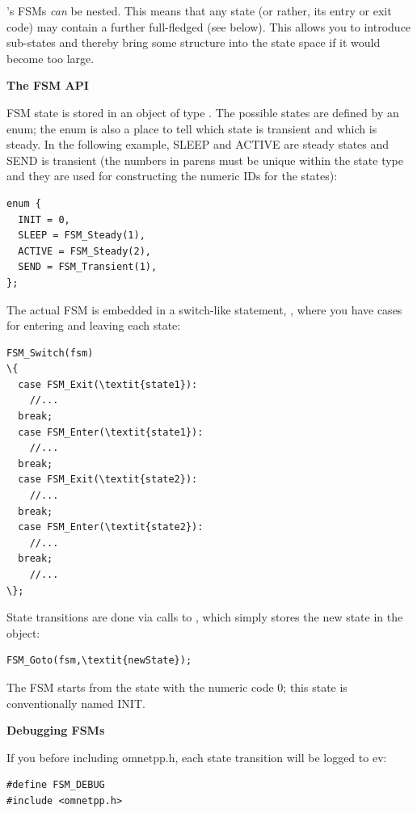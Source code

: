 {\opp}'s FSMs \textit{can} be nested. This means
that any state (or rather, its entry or exit code) may contain a
further full-fledged  (see below). This allows you
to introduce sub-states and thereby bring some structure into the
state space if it would become too large.


\textbf{The FSM API}


FSM state is stored in an object of type . The possible states
are defined by an enum; the enum is also a place to tell which
state is transient and which is steady. In the following example, SLEEP
and ACTIVE are steady states and SEND is transient (the numbers
in parens must be unique within the state type and they are used
for constructing the numeric IDs for the states):

\begin{verbatim}
enum {
  INIT = 0,
  SLEEP = FSM_Steady(1),
  ACTIVE = FSM_Steady(2),
  SEND = FSM_Transient(1),
};
\end{verbatim}



The actual FSM is embedded in a switch-like statement,
, where you have cases for entering and leaving
each state:


\begin{Verbatim}[commandchars=\\\{\}]
FSM_Switch(fsm)
\{
  case FSM_Exit(\textit{state1}):
    //...
  break;
  case FSM_Enter(\textit{state1}):
    //...
  break;
  case FSM_Exit(\textit{state2}):
    //...
  break;
  case FSM_Enter(\textit{state2}):
    //...
  break;
    //...
\};
\end{Verbatim}


State transitions are done via calls to
, which simply stores the new state in the
 object:

\begin{Verbatim}[commandchars=\\\{\}]
FSM_Goto(fsm,\textit{newState});
\end{Verbatim}

The FSM starts from the state with the numeric code 0; this state
is conventionally named INIT.


\textbf{Debugging FSMs}


If you  before including
omnetpp.h, each state transition will be logged to ev:


\begin{Verbatim}[commandchars=\\\{\}]
#define FSM_DEBUG
#include <omnetpp.h>
\end{Verbatim}



